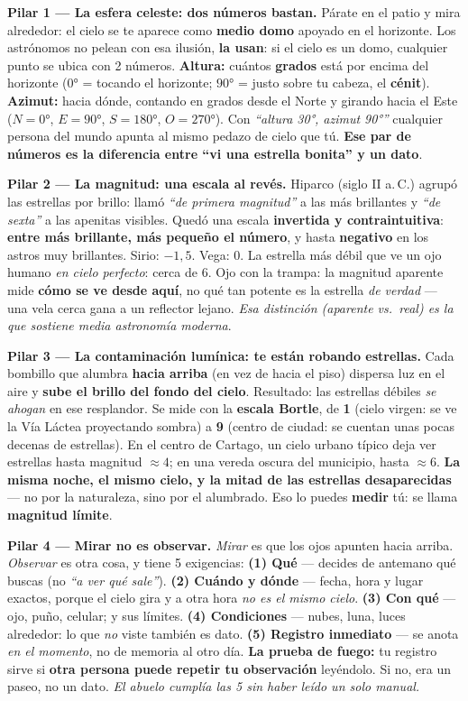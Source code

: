 \documentclass[11pt,letterpaper]{article}
\newcommand{\milcpaso}[3]{%
\Needspace{4\baselineskip}%
\begin{tcolorbox}[enhanced,colback=white,colframe=milcLinea,arc=1.5mm,boxrule=.9pt,
  left=14mm,right=4mm,top=3mm,bottom=3mm,before skip=4pt,after skip=4pt,
  fontupper=\RaggedRight,
  overlay={\node[anchor=north west,circle,fill=#2,text=white,inner sep=0pt,
    minimum size=7.4mm,font=\sffamily\bfseries\small]
    at ([xshift=3.6mm,yshift=-3.2mm]frame.north west) {#1};}]
#3
\end{tcolorbox}}
\begin{document}
\milcpaso{1}{milcTurquesa}{\textbf{Pilar 1 --- La esfera celeste: dos números bastan.} Párate en el patio y mira alrededor: el cielo se te aparece como \textbf{medio domo} apoyado en el horizonte. Los astrónomos no pelean con esa ilusión, \textbf{la usan}: si el cielo es un domo, cualquier punto se ubica con 2 números. \textbf{Altura:} cuántos \textbf{grados} está por encima del horizonte ($0°$ = tocando el horizonte; $90°$ = justo sobre tu cabeza, el \textbf{cénit}). \textbf{Azimut:} hacia dónde, contando en grados desde el Norte y girando hacia el Este ($N = 0°$, $E = 90°$, $S = 180°$, $O = 270°$). Con \emph{``altura 30°, azimut 90°''} cualquier persona del mundo apunta al mismo pedazo de cielo que tú. \textbf{Ese par de números es la diferencia entre ``vi una estrella bonita'' y un dato}.}
\milcpaso{2}{milcTurquesa}{\textbf{Pilar 2 --- La magnitud: una escala al revés.} Hiparco (siglo II a.\,C.) agrupó las estrellas por brillo: llamó \emph{``de primera magnitud''} a las más brillantes y \emph{``de sexta''} a las apenitas visibles. Quedó una escala \textbf{invertida y contraintuitiva}: \textbf{entre más brillante, más pequeño el número}, y hasta \textbf{negativo} en los astros muy brillantes. Sirio: $-1{,}5$. Vega: $0$. La estrella más débil que ve un ojo humano \emph{en cielo perfecto}: cerca de $6$. Ojo con la trampa: la magnitud aparente mide \textbf{cómo se ve desde aquí}, no qué tan potente es la estrella \emph{de verdad} --- una vela cerca gana a un reflector lejano. \emph{Esa distinción (aparente vs.\ real) es la que sostiene media astronomía moderna}.}
\milcpaso{3}{milcTurquesa}{\textbf{Pilar 3 --- La contaminación lumínica: te están robando estrellas.} Cada bombillo que alumbra \textbf{hacia arriba} (en vez de hacia el piso) dispersa luz en el aire y \textbf{sube el brillo del fondo del cielo}. Resultado: las estrellas débiles \emph{se ahogan} en ese resplandor. Se mide con la \textbf{escala Bortle}, de \textbf{1} (cielo virgen: se ve la Vía Láctea proyectando sombra) a \textbf{9} (centro de ciudad: se cuentan unas pocas decenas de estrellas). En el centro de Cartago, un cielo urbano típico deja ver estrellas hasta magnitud $\approx 4$; en una vereda oscura del municipio, hasta $\approx 6$. \textbf{La misma noche, el mismo cielo, y la mitad de las estrellas desaparecidas} --- no por la naturaleza, sino por el alumbrado. Eso lo puedes \textbf{medir} tú: se llama \textbf{magnitud límite}.}
\milcpaso{4}{milcTurquesa}{\textbf{Pilar 4 --- Mirar no es observar.} \emph{Mirar} es que los ojos apunten hacia arriba. \emph{Observar} es otra cosa, y tiene 5 exigencias: \textbf{(1) Qué} --- decides de antemano qué buscas (no \emph{``a ver qué sale''}). \textbf{(2) Cuándo y dónde} --- fecha, hora y lugar exactos, porque el cielo gira y a otra hora \emph{no es el mismo cielo}. \textbf{(3) Con qué} --- ojo, puño, celular; y sus límites. \textbf{(4) Condiciones} --- nubes, luna, luces alrededor: lo que \emph{no} viste también es dato. \textbf{(5) Registro inmediato} --- se anota \emph{en el momento}, no de memoria al otro día. \textbf{La prueba de fuego:} tu registro sirve si \textbf{otra persona puede repetir tu observación} leyéndolo. Si no, era un paseo, no un dato. \emph{El abuelo cumplía las 5 sin haber leído un solo manual.}}
\end{document}

